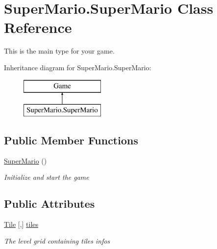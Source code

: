 \hypertarget{class_super_mario_1_1_super_mario}{}\section{Super\+Mario.\+Super\+Mario Class Reference}
\label{class_super_mario_1_1_super_mario}


This is the main type for your game.  


Inheritance diagram for Super\+Mario.\+Super\+Mario\+:\begin{figure}[H]
\begin{center}
\leavevmode
\includegraphics[height=2.000000cm]{class_super_mario_1_1_super_mario}
\end{center}
\end{figure}
\subsection*{Public Member Functions}
\begin{DoxyCompactItemize}
\item 
\mbox{\hyperlink{class_super_mario_1_1_super_mario_aaa56875411697b4bc007ec0b0c84a211}{Super\+Mario}} ()
\begin{DoxyCompactList}\small\item\em Initialize and start the game \end{DoxyCompactList}\end{DoxyCompactItemize}
\subsection*{Public Attributes}
\begin{DoxyCompactItemize}
\item 
\mbox{\hyperlink{class_super_mario_1_1_tile}{Tile}} \mbox{[},\mbox{]} \mbox{\hyperlink{class_super_mario_1_1_super_mario_a6f0b4c9d00e636d974465ea28e7b32c3}{tiles}}
\begin{DoxyCompactList}\small\item\em The level grid containing tiles infos \end{DoxyCompactList}\end{DoxyCompactItemize}
